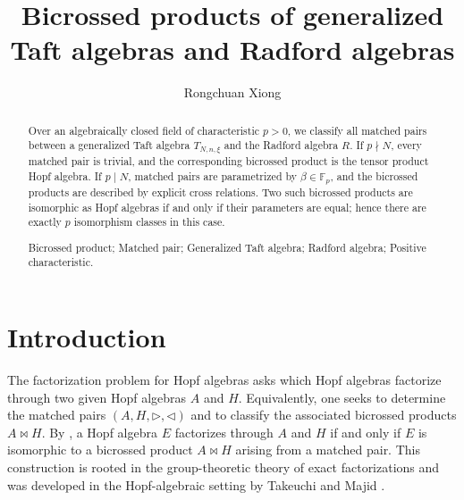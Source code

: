 \documentclass[twoside,11pt]{amsart}
\begin{document}
	
	\title[Bicrossed products with Radford algebras]{Bicrossed products of generalized Taft algebras and Radford algebras}
	\author{Rongchuan Xiong}
	\address{Department of Mathematics, Changzhou University, Changzhou 213164, China}
	
	\makeatletter
	\makeatother
	
	\date{}
	
	\begin{abstract}
		Over an algebraically closed field of characteristic $p>0$, we classify
		all matched pairs between a generalized Taft algebra $T_{N,n,\xi}$ and
		the Radford algebra $R$. If $p\nmid N$, every matched pair is trivial,
		and the corresponding bicrossed product is the tensor product Hopf
		algebra. If $p\mid N$, matched pairs are parametrized by
		$\beta\in\mathbb F_p$, and the bicrossed products are described by
		explicit cross relations. Two such bicrossed products are isomorphic as
		Hopf algebras if and only if their parameters are equal; hence there are
		exactly $p$ isomorphism classes in this case.
		
		\bigskip
		 Bicrossed product; Matched pair; Generalized Taft
		algebra; Radford algebra; Positive characteristic.
	\end{abstract}
	
	\maketitle
	
	
	
	\section{Introduction}\label{sec:intro}
	
	The factorization problem for Hopf algebras asks which Hopf algebras factorize through two given Hopf algebras $A$ and $H$. Equivalently,
	one seeks to determine the matched pairs $(A,H,\triangleright,\triangleleft)$
	and to classify the associated bicrossed products $A\bowtie H$. By
	\cite[Proposition 3.12]{Majid90}, a Hopf algebra $E$ factorizes through $A$
	and $H$ if and only if $E$ is isomorphic to a bicrossed product
	$A\bowtie H$ arising from a matched pair. This construction is rooted in the
	group-theoretic theory of exact factorizations and was developed in the
	Hopf-algebraic setting by Takeuchi \cite{Takeuchi81} and Majid
	\cite{Majid90,Majid95}.
	
\end{document}
